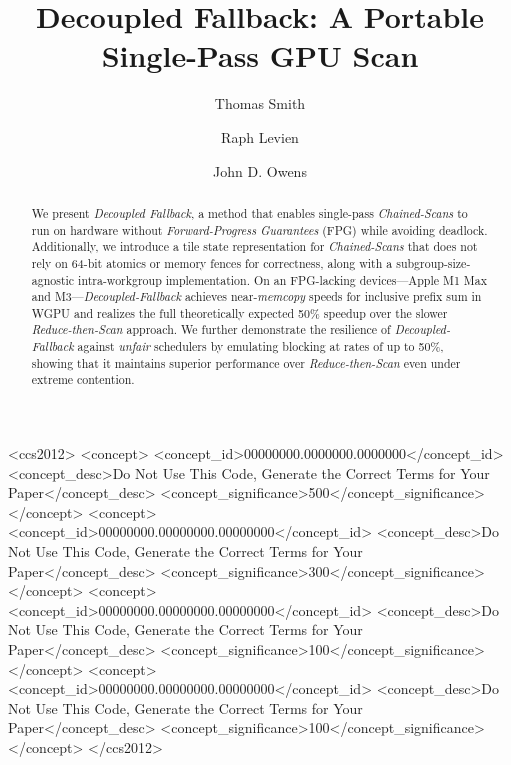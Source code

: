 \documentclass[sigconf]{acmart}
\begin{document}
\title{Decoupled Fallback: A Portable Single-Pass GPU Scan}

\author{Thomas Smith}

\author{Raph Levien}

\author{John D. Owens}

\renewcommand{\shortauthors}{Smith et al.}

\begin{abstract}
  We present \emph{Decoupled Fallback}, a method that enables single-pass \emph{Chained-Scans} to run on hardware without \emph{Forward-Progress Guarantees} (FPG) while avoiding deadlock. Additionally, we introduce a tile state representation for \emph{Chained-Scans} that does not rely on 64-bit atomics or memory fences for correctness, along with a subgroup-size-agnostic intra-workgroup implementation. On an FPG-lacking devices---Apple M1 Max and M3---\emph{Decoupled-Fallback} achieves near-\emph{memcopy} speeds for inclusive prefix sum in WGPU and realizes the full theoretically expected 50\% speedup over the slower \emph{Reduce-then-Scan} approach. We further demonstrate the resilience of \emph{Decoupled-Fallback} against \emph{unfair} schedulers by emulating blocking at rates of up to 50\%, showing that it maintains superior performance over \emph{Reduce-then-Scan} even under extreme contention.
\end{abstract}

\begin{CCSXML}
  <ccs2012>
  <concept>
  <concept_id>00000000.0000000.0000000</concept_id>
  <concept_desc>Do Not Use This Code, Generate the Correct Terms for Your Paper</concept_desc>
  <concept_significance>500</concept_significance>
  </concept>
  <concept>
  <concept_id>00000000.00000000.00000000</concept_id>
  <concept_desc>Do Not Use This Code, Generate the Correct Terms for Your Paper</concept_desc>
  <concept_significance>300</concept_significance>
  </concept>
  <concept>
  <concept_id>00000000.00000000.00000000</concept_id>
  <concept_desc>Do Not Use This Code, Generate the Correct Terms for Your Paper</concept_desc>
  <concept_significance>100</concept_significance>
  </concept>
  <concept>
  <concept_id>00000000.00000000.00000000</concept_id>
  <concept_desc>Do Not Use This Code, Generate the Correct Terms for Your Paper</concept_desc>
  <concept_significance>100</concept_significance>
  </concept>
  </ccs2012>
\end{CCSXML}
\end{document}

